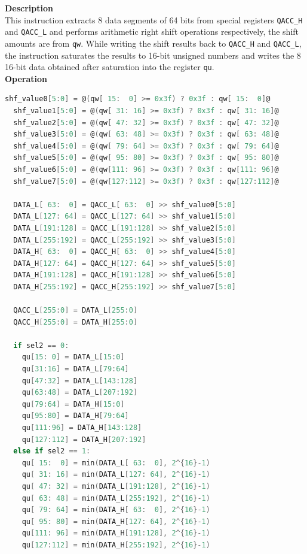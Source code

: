 \textbf{Description}\\
This instruction extracts 8 data segments of 64 bits from special registers \lstinline{QACC_H} and \lstinline{QACC_L} and performs arithmetic right shift operations respectively, the shift amounts are from \lstinline{qw}. While writing the shift results back to \lstinline{QACC_H} and \lstinline{QACC_L}, the instruction saturates the results to 16-bit unsigned numbers and writes the 8 16-bit data obtained after saturation into the register \lstinline{qu}.\\
\textbf{Operation}
\begin{lstlisting}[language=C, escapechar=@]
  shf_value0[5:0] = @(qw[ 15:  0] >= 0x3f) ? 0x3f : qw[ 15:  0]@
  shf_value1[5:0] = @(qw[ 31: 16] >= 0x3f) ? 0x3f : qw[ 31: 16]@
  shf_value2[5:0] = @(qw[ 47: 32] >= 0x3f) ? 0x3f : qw[ 47: 32]@
  shf_value3[5:0] = @(qw[ 63: 48] >= 0x3f) ? 0x3f : qw[ 63: 48]@
  shf_value4[5:0] = @(qw[ 79: 64] >= 0x3f) ? 0x3f : qw[ 79: 64]@
  shf_value5[5:0] = @(qw[ 95: 80] >= 0x3f) ? 0x3f : qw[ 95: 80]@
  shf_value6[5:0] = @(qw[111: 96] >= 0x3f) ? 0x3f : qw[111: 96]@
  shf_value7[5:0] = @(qw[127:112] >= 0x3f) ? 0x3f : qw[127:112]@

  DATA_L[ 63:  0] = QACC_L[ 63:  0] >> shf_value0[5:0]
  DATA_L[127: 64] = QACC_L[127: 64] >> shf_value1[5:0]
  DATA_L[191:128] = QACC_L[191:128] >> shf_value2[5:0]
  DATA_L[255:192] = QACC_L[255:192] >> shf_value3[5:0]
  DATA_H[ 63:  0] = QACC_H[ 63:  0] >> shf_value4[5:0]
  DATA_H[127: 64] = QACC_H[127: 64] >> shf_value5[5:0]
  DATA_H[191:128] = QACC_H[191:128] >> shf_value6[5:0]
  DATA_H[255:192] = QACC_H[255:192] >> shf_value7[5:0]

  QACC_L[255:0] = DATA_L[255:0]
  QACC_H[255:0] = DATA_H[255:0]

  if sel2 == 0:
    qu[15: 0] = DATA_L[15:0]
    qu[31:16] = DATA_L[79:64]
    qu[47:32] = DATA_L[143:128]
    qu[63:48] = DATA_L[207:192]
    qu[79:64] = DATA_H[15:0]
    qu[95:80] = DATA_H[79:64]
    qu[111:96] = DATA_H[143:128]
    qu[127:112] = DATA_H[207:192]
  else if sel2 == 1:
    qu[ 15:  0] = min(DATA_L[ 63:  0], 2^{16}-1)
    qu[ 31: 16] = min(DATA_L[127: 64], 2^{16}-1)
    qu[ 47: 32] = min(DATA_L[191:128], 2^{16}-1)
    qu[ 63: 48] = min(DATA_L[255:192], 2^{16}-1)
    qu[ 79: 64] = min(DATA_H[ 63:  0], 2^{16}-1)
    qu[ 95: 80] = min(DATA_H[127: 64], 2^{16}-1)
    qu[111: 96] = min(DATA_H[191:128], 2^{16}-1)
    qu[127:112] = min(DATA_H[255:192], 2^{16}-1)
\end{lstlisting}


